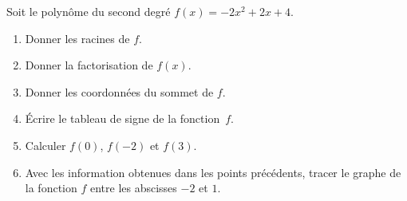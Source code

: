 
\begin{exercice}\label{exoPremiere-0097}

    Soit le polynôme du second degré \( f(x)=-2x^2+2x+4\).
    \begin{multicols}{2}
        \begin{enumerate}
            \item
                Donner les racines de \( f\).
            \item
                Donner la factorisation de \( f(x)\).
            \item
                Donner les coordonnées du sommet de \( f\).
            \item
                Écrire le tableau de signe de la fonction~\( f\).
            \item
                Calculer \( f(0)\), \( f(-2)\) et \( f(3)\).
            \item
                Avec les information obtenues dans les points précédents, tracer le graphe de la fonction \( f\) entre les abscisses \( -2\) et \( 1\).
        \end{enumerate}
    \end{multicols}

\end{exercice}
